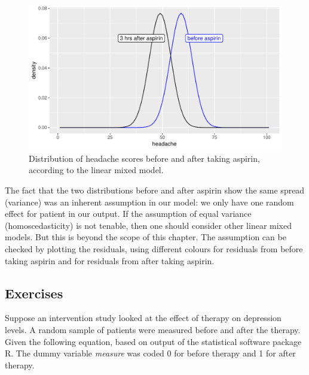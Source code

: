\documentclass[]{book}\usepackage[]{graphicx}\usepackage[]{color}
\makeatletter
\def\maxwidth{ %
  \ifdim\Gin@nat@width>\linewidth
    \linewidth
  \else
    \Gin@nat@width
  \fi
}
\newenvironment{knitrout}{}{} %
\makeatother
\begin{document}
\begin{knitrout}
\color{fgcolor}\begin{figure}

{\centering \includegraphics[width=\maxwidth]{figure/resultsanalysisprepost2-1} 

}

\caption[Distribution of headache scores before and after taking aspirin, according to the linear mixed model]{Distribution of headache scores before and after taking aspirin, according to the linear mixed model.}\label{fig:resultsanalysisprepost2}
\end{figure}


\end{knitrout}



The fact that the two distributions before and after aspirin show the same spread (variance) was an inherent assumption in our model: we only have one random effect for patient in our output. If the assumption of equal variance (homoscedasticity) is not tenable, then one should consider other linear mixed models. But this is beyond the scope of this chapter. The assumption can be checked by plotting the residuals, using different colours for residuals from before taking aspirin and for residuals from after taking aspirin. 



\subsection{Exercises}

Suppose an intervention study looked at the effect of therapy on depression levels. A random sample of patients were measured before and after the therapy. Given the following equation, based on output of the statistical software package R. The dummy variable \textit{measure} was coded 0 for before therapy and 1 for after therapy.
\end{document}
